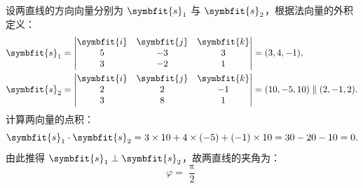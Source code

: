 \begin{solution}

    设两直线的方向向量分别为 $\symbfit{s}_1$ 与 $\symbfit{s}_2$，根据法向量的外积定义：
    \begin{equation}
        \begin{aligned}
            \symbfit{s}_1 & = \begin{vmatrix} \symbfit{i} & \symbfit{j} & \symbfit{k} \\ 5 & -3 & 3 \\ 3 & -2 & 1 \end{vmatrix} = (3, 4, -1),                       \\
            \symbfit{s}_2 & = \begin{vmatrix} \symbfit{i} & \symbfit{j} & \symbfit{k} \\ 2 & 2 & -1 \\ 3 & 8 & 1 \end{vmatrix} = (10, -5, 10) \parallel (2, -1, 2).
        \end{aligned}
    \end{equation}
    计算两向量的点积：
    \begin{equation}
        \symbfit{s}_1 \cdot \symbfit{s}_2 = 3 \times 10 + 4 \times (-5) + (-1) \times 10 = 30 - 20 - 10 = 0.
    \end{equation}
    由此推得 $\symbfit{s}_1 \perp \symbfit{s}_2$，故两直线的夹角为：
    \begin{equation}
        \boxed{\varphi = \frac{\uppi}{2}}
    \end{equation}



\end{solution}
